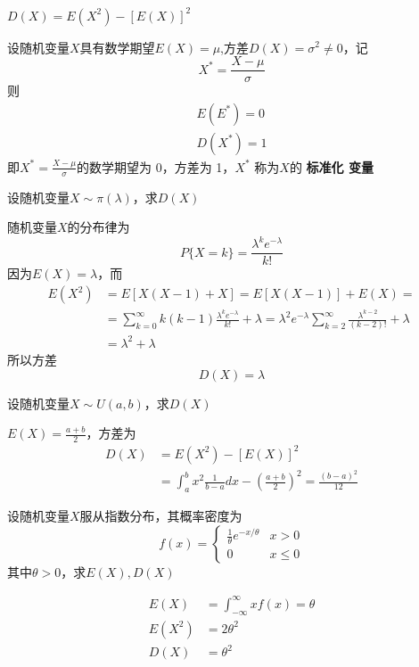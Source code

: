 \documentclass[11pt]{article}
\begin{document}
\begin{theorem}[]
\(D(X)=E(X^2)-[E(X)]^2\)
\end{theorem}

\begin{examplle}[]
设随机变量\(X\)具有数学期望\(E(X)=\mu\),方差\(D(X)=\sigma^2\neq0\)，记
\begin{equation*}
X^*=\frac{X-\mu}{\sigma}
\end{equation*}
则
\begin{gather*}
E(E^*)=0\\
D(X^*)=1
\end{gather*}
即\(X^*=\frac{X-\mu}{\sigma}\)的数学期望为 0，方差为 1，\(X^*\) 称为\(X\)的 \textbf{标准化
变量}
\end{examplle}

\begin{examplle}[]
设随机变量\(X\sim\pi(\lambda)\)，求\(D(X)\)

随机变量\(X\)的分布律为
\begin{equation*}
P\{X=k\}=\frac{\lambda^ke^{-\lambda}}{k!}
\end{equation*}
因为\(E(X)=\lambda\)，而
\begin{align*}
E(X^2)&=E[X(X-1)+X]=E[X(X-1)]+E(X)=\\
&=\sum_{k=0}^{\infty}k(k-1)\frac{\lambda^ke^{-\lambda}}{k!}+\lambda=
\lambda^2e^{-\lambda}\sum_{k=2}^\infty\frac{\lambda^{k-2}}{(k-2)!}+\lambda\\
&=\lambda^2+\lambda
\end{align*}
所以方差
\begin{equation*}
D(X)=\lambda
\end{equation*}
\end{examplle}

\begin{examplle}[]
设随机变量\(X\sim U(a,b)\)，求\(D(X)\)

\(E(X)=\frac{a+b}{2}\)，方差为
\begin{align*}
D(X)&=E(X^2)-[E(X)]^2\\
&=\int_a^bx^2\frac{1}{b-a}dx-(\frac{a+b}{2})^2=\frac{(b-a)^2}{12}
\end{align*}
\end{examplle}

\begin{examplle}[]
设随机变量\(X\)服从指数分布，其概率密度为
\begin{equation*}
f(x)=
\begin{cases}
\frac{1}{\theta}e^{-x/\theta}&x>0\\
0&x\le0
\end{cases}
\end{equation*}
其中\(\theta>0\)，求\(E(X),D(X)\)

\begin{align*}
E(X)&=\int_{-\infty}^\infty xf(x)=\theta\\
E(X^2)&=2\theta^2\\
D(X)&=\theta^2
\end{align*}
\end{examplle}
\end{document}
